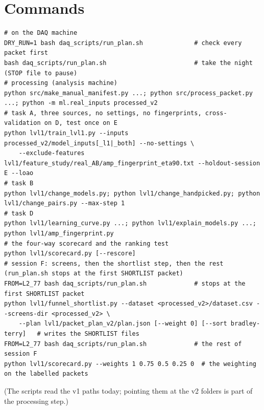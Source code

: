 \documentclass[11pt]{article}
\begin{document}
\section{Commands}
\begin{Verbatim}
# on the DAQ machine
DRY_RUN=1 bash daq_scripts/run_plan.sh              # check every packet first
bash daq_scripts/run_plan.sh                        # take the night (STOP file to pause)
# processing (analysis machine)
python src/make_manual_manifest.py ...; python src/process_packet.py ...; python -m ml.real_inputs processed_v2
# task A, three sources, no settings, no fingerprints, cross-validation on D, test once on E
python lvl1/train_lvl1.py --inputs processed_v2/model_inputs[_l1|_both] --no-settings \
    --exclude-features lvl1/feature_study/real_AB/amp_fingerprint_eta90.txt --holdout-session E --loao
# task B
python lvl1/change_models.py; python lvl1/change_handpicked.py; python lvl1/change_pairs.py --max-step 1
# task D
python lvl1/learning_curve.py ...; python lvl1/explain_models.py ...; python lvl1/amp_fingerprint.py
# the four-way scorecard and the ranking test
python lvl1/scorecard.py [--rescore]
# session F: screens, then the shortlist step, then the rest (run_plan.sh stops at the first SHORTLIST packet)
FROM=L2_77 bash daq_scripts/run_plan.sh             # stops at the first SHORTLIST packet
python lvl1/funnel_shortlist.py --dataset <processed_v2>/dataset.csv --screens-dir <processed_v2> \
    --plan lvl1/packet_plan_v2/plan.json [--weight 0] [--sort bradley-terry]   # writes the SHORTLIST files
FROM=L2_77 bash daq_scripts/run_plan.sh             # the rest of session F
python lvl1/scorecard.py --weights 1 0.75 0.5 0.25 0  # the weighting on the labelled packets
\end{Verbatim}
(The scripts read the v1 paths today; pointing them at the v2 folders is part of the processing step.)
\end{document}
